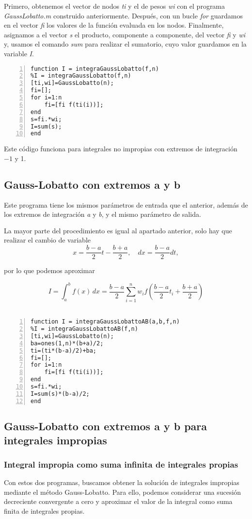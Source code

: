 \documentclass[a4paper]{article}
\begin{document}
Primero, obtenemos el vector de nodos \textit{ti} y el de pesos \textit{wi} con el programa \textit{GaussLobatto.m} construido anteriormente. Después, con un bucle \textit{for} guardamos en el vector \textit{fi} los valores de la función evaluada en los nodos. Finalmente, asignamos a el vector \textit{s} el producto, componente a componente, del vector \textit{fi} y \textit{wi} y, usamos el comando \textit{sum} para realizar el sumatorio, cuyo valor guardamos en la variable \textit{I}.
\begin{lstlisting}[frame=single, numbers=left, style=Matlab-Pyglike]
function I = integraGaussLobatto(f,n)
%I = integraGaussLobatto(f,n)
[ti,wi]=GaussLobatto(n);
fi=[];
for i=1:n
    fi=[fi f(ti(i))];
end
s=fi.*wi;
I=sum(s);
end
\end{lstlisting}

Este código funciona para integrales no impropias con extremos de integración $-1$ y 1.

\subsection{Gauss-Lobatto con extremos a y b}
Este programa tiene los mismos parámetros de entrada que el anterior, además de los extremos de integración \textit{a} y \textit{b}, y el mismo parámetro de salida.

La mayor parte del procedimiento es igual al apartado anterior, solo hay que realizar el cambio de variable
\[x=\frac{b-a}{2}t-\frac{b+a}{2},\quad dx=\frac{b-a}{2}dt,\]

por lo que podemos aproximar

\[\displaystyle I=\int_{a}^{b} \! f(x)  \,dx = \frac{b-a}{2} \sum_{i=1}^{n}w_i f \left(\frac{b-a}{2}t_i + \frac{b+a}{2} \right)\]
\\
\begin{lstlisting}[frame=single, numbers=left, style=Matlab-Pyglike]
function I = integraGaussLobattoAB(a,b,f,n)
%I = integraGaussLobattoAB(f,n)
[ti,wi]=GaussLobatto(n);
ba=ones(1,n)*(b+a)/2;
ti=(ti*(b-a)/2)+ba;
fi=[];
for i=1:n
    fi=[fi f(ti(i))];
end
s=fi.*wi;
I=sum(s)*(b-a)/2;
end
\end{lstlisting}

\subsection{Gauss-Lobatto con extremos a y b para integrales impropias}

\subsubsection{Integral impropia como suma infinita de integrales propias}
Con estos dos programas, buscamos obtener la solución de integrales impropias mediante el método Gauss-Lobatto. Para ello,  podemos considerar una sucesión decreciente convergente a cero y aproximar el valor de la integral como suma
 finita de integrales propias.
 
\end{document}
